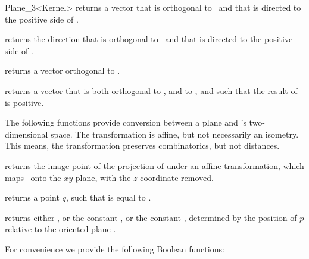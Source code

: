 \begin{ccRefClass} {Plane_3<Kernel>}
       {returns a vector that is orthogonal to \ccVar\ and that
        is directed to the positive side of \ccVar.}

       {returns the direction that is orthogonal to \ccVar\ and that
        is directed to the positive side of \ccVar.}

       {returns a vector orthogonal to 
        .}

       {returns a vector that is both orthogonal to ,
        and to , and such that the result of 
         is positive.}


The following functions provide conversion between a plane and 
\cgal's two-dimensional space. The transformation is affine, but
not necessarily an isometry. This means, the transformation preserves
combinatorics, but not distances.

       {returns the image point of the projection of  
       under an affine transformation, which maps \ccVar\ onto the 
       $xy$-plane, with the $z$-coordinate removed.}

       {returns a point $q$, such that 
        is equal to .}

\ccPredicates

       {returns either , or
        the constant , or the constant
        , 
        determined by the position of $p$ relative to the oriented plane \ccVar.
        }

For convenience we provide the following Boolean functions:

       {}
\ccGlue
{}
       {}
\ccGlue
{}
       {}


\end{ccRefClass}
